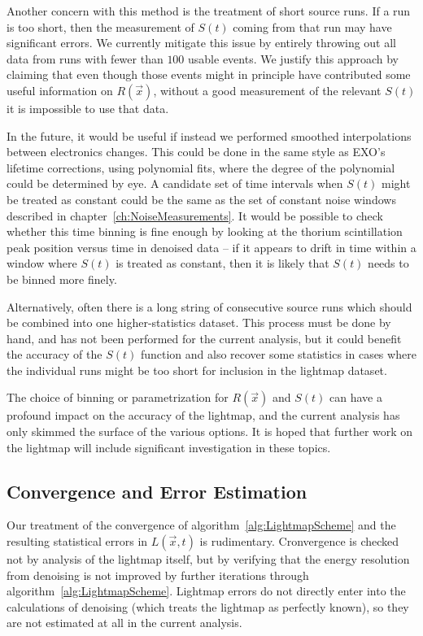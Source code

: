 Another concern with this method is the treatment of short source runs.  If a run is too short, then the measurement of $S(t)$ coming from that run may have significant errors.  We currently mitigate this issue by entirely throwing out all data from runs with fewer than $100$ usable events.  We justify this approach by claiming that even though those events might in principle have contributed some useful information on $R(\vec{x})$, without a good measurement of the relevant $S(t)$ it is impossible to use that data.

In the future, it would be useful if instead we performed smoothed interpolations between electronics changes.  This could be done in the same style as EXO's lifetime corrections, using polynomial fits, where the degree of the polynomial could be determined by eye.  A candidate set of time intervals when $S(t)$ might be treated as constant could be the same as the set of constant noise windows described in chapter~\ref{ch:NoiseMeasurements}.  It would be possible to check whether this time binning is fine enough by looking at the thorium scintillation peak position versus time in denoised data -- if it appears to drift in time within a window where $S(t)$ is treated as constant, then it is likely that $S(t)$ needs to be binned more finely.

Alternatively, often there is a long string of consecutive source runs which should be combined into one higher-statistics dataset.  This process must be done by hand, and has not been performed for the current analysis, but it could benefit the accuracy of the $S(t)$ function and also recover some statistics in cases where the individual runs might be too short for inclusion in the lightmap dataset.

The choice of binning or parametrization for $R(\vec{x})$ and $S(t)$ can have a profound impact on the accuracy of the lightmap, and the current analysis has only skimmed the surface of the various options.  It is hoped that further work on the lightmap will include significant investigation in these topics.

\subsection{Convergence and Error Estimation}

Our treatment of the convergence of algorithm~\ref{alg:LightmapScheme} and the resulting statistical errors in $L(\vec{x}, t)$ is rudimentary.  Cronvergence is checked not by analysis of the lightmap itself, but by verifying that the energy resolution from denoising is not improved by further iterations through algorithm~\ref{alg:LightmapScheme}.  Lightmap errors do not directly enter into the calculations of denoising (which treats the lightmap as perfectly known), so they are not estimated at all in the current analysis.

